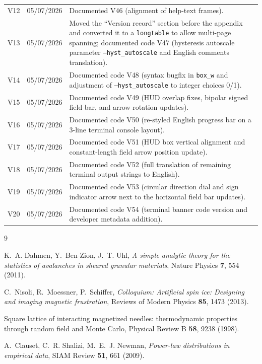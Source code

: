 \documentclass[11pt,a4paper]{article}
\newcommand{\code}[1]{\texttt{#1}}
\begin{document}
\begin{tabular}{@{}lll@{}}
V12 & 05/07/2026 & Documented V46 (alignment of help-text frames). \\
V13 & 05/07/2026 & Moved the ``Version record'' section before the appendix and converted it to a \code{longtable} to allow multi-page spanning; documented code V47 (hysteresis autoscale parameter \code{--hyst\_autoscale} and English comments translation). \\
V14 & 05/07/2026 & Documented code V48 (syntax bugfix in \code{box\_w} and adjustment of \code{--hyst\_autoscale} to integer choices 0/1). \\
V15 & 05/07/2026 & Documented code V49 (HUD overlap fixes, bipolar signed field bar, and arrow rotation updates). \\
V16 & 05/07/2026 & Documented code V50 (re-styled English progress bar on a 3-line terminal console layout). \\
V17 & 05/07/2026 & Documented code V51 (HUD box vertical alignment and constant-length field arrow position update). \\
V18 & 05/07/2026 & Documented code V52 (full translation of remaining terminal output strings to English). \\
V19 & 05/07/2026 & Documented code V53 (circular direction dial and sign indicator arrow next to the horizontal field bar updates). \\
V20 & 05/07/2026 & Documented code V54 (terminal banner code version and developer metadata addition). \\
\bottomrule
\end{tabular}

\begin{thebibliography}{9}

K.~A. Dahmen, Y.~Ben-Zion, J.~T. Uhl,
\emph{A simple analytic theory for the statistics of avalanches in
sheared granular materials},
Nature Physics \textbf{7}, 554 (2011).

C.~Nisoli, R.~Moessner, P.~Schiffer,
\emph{Colloquium: Artificial spin ice: Designing and imaging magnetic
frustration},
Reviews of Modern Physics \textbf{85}, 1473 (2013).

Square lattice of interacting magnetized needles: thermodynamic
properties through random field and Monte Carlo,
Physical Review B \textbf{58}, 9238 (1998).

A.~Clauset, C.~R. Shalizi, M.~E.~J. Newman,
\emph{Power-law distributions in empirical data},
SIAM Review \textbf{51}, 661 (2009).

\end{thebibliography}
\end{document}

